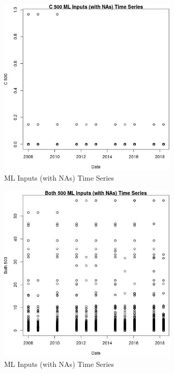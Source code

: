 \begin{figure} 
\centering  
\includegraphics[width=0.77\textwidth]{Code_Outputs/Report_ML_input_PM25_Step4_part_e_de_duplicated_aves_compiled_2019-05-18wNAs_C_500vDate.jpg} 
\caption{\label{fig:Report_ML_input_PM25_Step4_part_e_de_duplicated_aves_compiled_2019-05-18wNAsC_500vDate}ML Inputs (with NAs) Time Series} 
\end{figure} 
 

\begin{figure} 
\centering  
\includegraphics[width=0.77\textwidth]{Code_Outputs/Report_ML_input_PM25_Step4_part_e_de_duplicated_aves_compiled_2019-05-18wNAs_Both_500vDate.jpg} 
\caption{\label{fig:Report_ML_input_PM25_Step4_part_e_de_duplicated_aves_compiled_2019-05-18wNAsBoth_500vDate}ML Inputs (with NAs) Time Series} 
\end{figure} 
 

